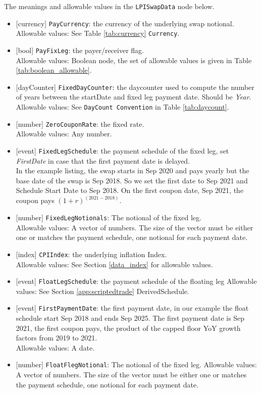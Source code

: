 The meanings and allowable values in the \lstinline!LPISwapData! node below.

\begin{itemize}
  \item{}[currency] \lstinline!PayCurrency!:  the currency of the underlying swap notional. \\
  Allowable values: See Table \ref{tab:currency} \lstinline!Currency!.  
  \item{}[bool] \lstinline!PayFixLeg!: the payer/receiver flag. \\
    Allowable values: Boolean node, the set of allowable values is given in Table \ref{tab:boolean_allowable}.
  \item{}[dayCounter] \lstinline!FixedDayCounter!:  the daycounter used to compute the number of years between the startDate and fixed leg payment date. Should be \emph{Year}.\\
    Allowable values: See \lstinline!DayCount Convention! in Table \ref{tab:daycount}.
  \item{}[number] \lstinline!ZeroCouponRate!: the fixed rate.\\
    Allowable values: Any number.
\item{}[event] \lstinline!FixedLegSchedule!: the payment schedule of the fixed leg, set \emph{FirstDate} in case that the first payment date is delayed. \\
In the example listing, the swap starts in Sep 2020 and pays yearly but the base date of the swap is Sep 2018. So we set the first date to Sep 2021 and Schedule Start Date to Sep 2018. On the first coupon date, Sep 2021, the coupon pays $(1+r)^(2021-2018)$.
\item{}[number] \lstinline!FixedLegNotionals!: The notional of the fixed leg.\\
Allowable values: A vector of numbers. The size of the vector must be either one or matches the payment schedule, one notional for each payment date.
  \item{}[index] \lstinline!CPIIndex!:  the underlying inflation Index. \\
  Allowable values: See Section \ref{data_index} for allowable values.
\item{}[event] \lstinline!FloatLegSchedule!: the payment schedule of the floating leg
  Allowable values: See Section \ref{app:scriptedtrade} DerivedSchedule.
\item{}[event] \lstinline!FirstPaymentDate!: the first payment date, in our example the float schedule start Sep 2018 and ends Sep 2025. The first payment date is Sep 2021, the first coupon pays, the product of the capped floor YoY growth factors from 2019 to 2021.\\
Allowable values: A date.
  \item{}[number] \lstinline!FloatFlegNotional!: The notional of the fixed leg.
  Allowable values: A vector of numbers. The size of the vector must be either one or matches the payment schedule, one notional for each payment date.


\end{itemize}
